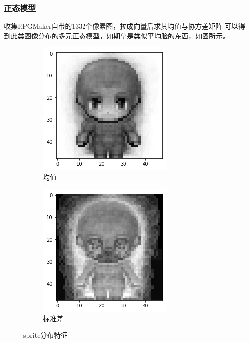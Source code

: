\documentclass{beamer}
\begin{document}
\begin{frame}
\frametitle{正态模型}
收集RPGMaker自带的1332个像素图，拉成向量后求其均值与协方差矩阵
可以得到此类图像分布的多元正态模型，如期望是类似平均脸的东西，如图所示。 

\begin{figure}[htb]
    \centering
    \begin{subfigure}[b]{0.3\linewidth}
        \includegraphics[width=\linewidth]{mean_sprite.png}
        \caption{均值}
      \end{subfigure}
      \begin{subfigure}[b]{0.3\linewidth}
        \includegraphics[width=\linewidth]{sd_sprtie.png}
        \caption{标准差}
      \end{subfigure}
      \caption{sprite分布特征}
      \label{fig:meansd}
\end{figure}


\end{frame}
\end{document}
